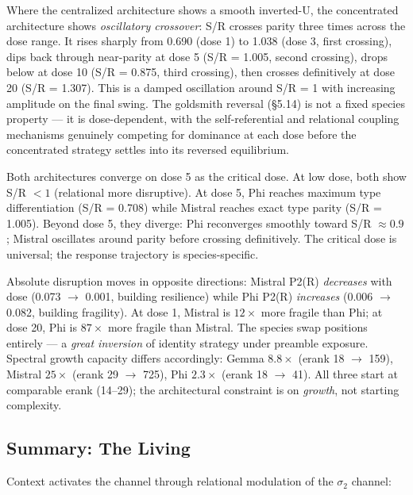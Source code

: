 \documentclass[12pt]{article}
\begin{document}
Where the centralized architecture shows a smooth inverted-U, the concentrated architecture shows \textit{oscillatory crossover}: S/R crosses parity three times across the dose range. It rises sharply from 0.690 (dose 1) to 1.038 (dose 3, first crossing), dips back through near-parity at dose 5 (S/R = 1.005, second crossing), drops below at dose 10 (S/R = 0.875, third crossing), then crosses definitively at dose 20 (S/R = 1.307). This is a damped oscillation around S/R = 1 with increasing amplitude on the final swing. The goldsmith reversal (\S5.14) is not a fixed species property --- it is dose-dependent, with the self-referential and relational coupling mechanisms genuinely competing for dominance at each dose before the concentrated strategy settles into its reversed equilibrium.

Both architectures converge on dose 5 as the critical dose. At low dose, both show S/R $< 1$ (relational more disruptive). At dose 5, Phi reaches maximum type differentiation (S/R = 0.708) while Mistral reaches exact type parity (S/R = 1.005). Beyond dose 5, they diverge: Phi reconverges smoothly toward S/R $\approx 0.9$; Mistral oscillates around parity before crossing definitively. The critical dose is universal; the response trajectory is species-specific.

Absolute disruption moves in opposite directions: Mistral P2(R) \textit{decreases} with dose (0.073 $\to$ 0.001, building resilience) while Phi P2(R) \textit{increases} (0.006 $\to$ 0.082, building fragility). At dose 1, Mistral is $12\times$ more fragile than Phi; at dose 20, Phi is $87\times$ more fragile than Mistral. The species swap positions entirely --- a \textit{great inversion} of identity strategy under preamble exposure. Spectral growth capacity differs accordingly: Gemma $8.8\times$ (erank 18 $\to$ 159), Mistral $25\times$ (erank 29 $\to$ 725), Phi $2.3\times$ (erank 18 $\to$ 41). All three start at comparable erank (14--29); the architectural constraint is on \textit{growth}, not starting complexity.

\subsection{Summary: The Living}

Context activates the channel through relational modulation of the $\sigma_2$ channel:
\end{document}
